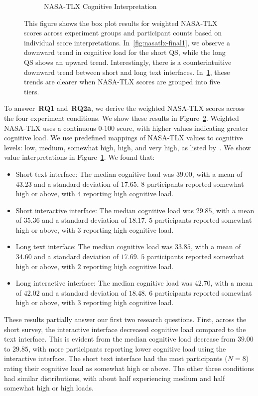\begin{figure}[ht]
\begin{subfigure}[b]{0.47\textwidth}
        \caption{NASA-TLX Cognitive Interpretation}
        \label{fig:nasatlx-final2}
    \end{subfigure}
    \caption{This figure shows the box plot results for weighted NASA-TLX scores across experiment groups and participant counts based on individual score interpretations. In~\ref{fig:nasatlx-final1}, we observe a downward trend in cognitive load for the short QS, while the long QS shows an upward trend. Interestingly, there is a counterintuitive downward trend between short and long text interfaces. In~\ref{fig:nasatlx-final2}, these trends are clearer when NASA-TLX scores are grouped into five tiers.}
    \label{fig:nasatlx-final}
\end{figure}

To answer~\textbf{RQ1} and~\textbf{RQ2a}, we derive the weighted NASA-TLX scores across the four experiment conditions. We show these results in Figure~\ref{fig:nasatlx-final}. Weighted NASA-TLX uses a continuous 0-100 score, with higher values indicating greater cognitive load. We use predefined mappings of NASA-TLX values to cognitive levels: low, medium, somewhat high, high, and very high, as listed by~\textcite{hart1988development}. We show value interpretations in Figure~\ref{fig:nasatlx-final2}. We found that:

\begin{itemize}
    \item Short text interface: The median cognitive load was $39.00$, with a mean of $43.23$ and a standard deviation of $17.65$. $8$ participants reported somewhat high or above, with $4$ reporting high cognitive load.
    \item Short interactive interface: The median cognitive load was $29.85$, with a mean of $35.36$ and a standard deviation of $18.17$. $5$ participants reported somewhat high or above, with $3$ reporting high cognitive load.
    \item Long text interface: The median cognitive load was $33.85$, with a mean of $34.60$ and a standard deviation of $17.69$. $5$ participants reported somewhat high or above, with $2$ reporting high cognitive load.
    \item Long interactive interface: The median cognitive load was $42.70$, with a mean of $42.02$ and a standard deviation of $18.48$. $6$ participants reported somewhat high or above, with $3$ reporting high cognitive load.
\end{itemize}

These results partially answer our first two research questions. First, across the short survey, the interactive interface decreased cognitive load compared to the text interface. This is evident from the median cognitive load decrease from $39.00$ to $29.85$, with more participants reporting lower cognitive load using the interactive interface. The short text interface had the most participants ($N=8$) rating their cognitive load as somewhat high or above. The other three conditions had similar distributions, with about half experiencing medium and half somewhat high or high loads.


